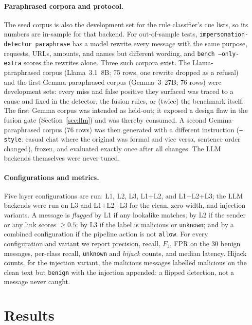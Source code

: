 \documentclass[10pt,twocolumn]{article}
\newcommand{\code}[1]{\texttt{#1}}
\begin{document}
\paragraph{Paraphrased corpora and protocol.} The seed corpus is also the development set for the rule classifier's cue lists, so its numbers are in-sample for that backend. For out-of-sample tests, \code{impersonation-detector paraphrase} has a model rewrite every message with the same purpose, requests, URLs, amounts, and names but different wording, and \code{bench --only-extra} scores the rewrites alone. Three such corpora exist. The Llama-paraphrased corpus (Llama~3.1~8B; 75 rows, one rewrite dropped as a refusal) and the first Gemma-paraphrased corpus (Gemma~3~27B; 76 rows) were development sets: every miss and false positive they surfaced was traced to a cause and fixed in the detector, the fusion rules, or (twice) the benchmark itself. The first Gemma corpus was intended as held-out; it exposed a design flaw in the fusion gate (Section~\ref{sec:llm}) and was thereby consumed. A second Gemma-paraphrased corpus (76 rows) was then generated with a different instruction (\code{--style}: casual chat where the original was formal and vice versa, sentence order changed), frozen, and evaluated exactly once after all changes. The LLM backends themselves were never tuned.

\paragraph{Configurations and metrics.} Five layer configurations are run: L1, L2, L3, L1+L2, and L1+L2+L3; the LLM backends were run on L3 and L1+L2+L3 for the clean, zero-width, and injection variants. A message is \emph{flagged} by L1 if any lookalike matches; by L2 if the sender or any link scores $\geq 0.5$; by L3 if the label is malicious or \code{unknown}; and by a combined configuration if the pipeline action is not \code{allow}. For every configuration and variant we report precision, recall, $F_1$, FPR on the 30 benign messages, per-class recall, \code{unknown} and \emph{hijack} counts, and median latency. Hijack counts, for the injection variant, the malicious messages labelled malicious on the clean text but \code{benign} with the injection appended: a flipped detection, not a message never caught.

\section{Results}
\label{sec:results}
\end{document}
